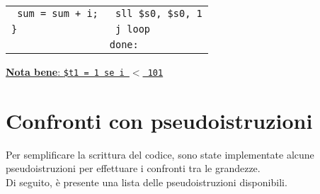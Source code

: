 \documentclass[../main.tex]{subfiles}
\begin{document}
\begin{tabular}{ p{9cm} p{9cm} }
    \texttt{ \hspace{0cm} sum = sum + i;} & \texttt{ \hspace{0cm} \hspace{0cm} \hspace{0cm} \hspace{0cm} \hspace{0cm} \hspace{0cm} sll \$s0, \$s0, 1} \\
    \texttt{\}} & \texttt{ \hspace{0cm} \hspace{0cm} \hspace{0cm} \hspace{0cm} \hspace{0cm} \hspace{0cm} j loop} \\
    & \texttt{done:} \\
\end{tabular}

\noindent
\underline{\textbf{Nota bene}: \texttt{\$t1 = 1 se i $<$ 101}}

\section{Confronti con pseudoistruzioni}
Per semplificare la scrittura del codice, sono state implementate alcune
pseudoistruzioni per effettuare i confronti tra le grandezze. \\
Di seguito, è presente una lista delle pseudoistruzioni disponibili.
\end{document}
